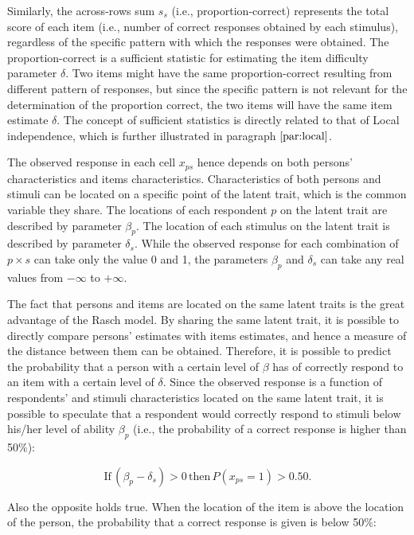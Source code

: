 \documentclass[12pt]{book}
\begin{document}
Similarly, the across-rows sum $s_s$ (i.e., proportion-correct) represents the total score of each item (i.e., number of correct responses obtained by each stimulus), regardless of the specific pattern with which the responses were obtained.  The proportion-correct is a sufficient statistic for estimating the item difficulty parameter $\delta$.
Two items might have the same proportion-correct resulting from different pattern of responses, but since the specific pattern is not relevant for the determination of the proportion correct, the two items will have the same item estimate $\delta$.
The concept of sufficient statistics is directly related to that of Local independence, which is further illustrated in paragraph $\ref{par:local}$.

The observed response in each cell $x_{ps}$ hence depends on both persons’ characteristics and items characteristics. 
Characteristics of both persons and stimuli can be located on a specific point of the latent trait, which is the common variable they share. 
The locations
 of each respondent $p$ on the latent trait are described by parameter $\beta_p$. The location of each stimulus on the latent trait is described by parameter $\delta_s$. 
While the observed response for each combination of $p \times s$ can take only the value 0 and 1, the parameters $\beta_p$ and $\delta_s$ can take any real values from $- \infty$ to $+ \infty$. 
 
The fact that persons and items are located on the same latent traits is the great advantage of the Rasch model. By sharing the same latent trait, it is possible to directly compare persons' estimates with items estimates, and hence a measure of the distance between them can be obtained. Therefore, it is possible to predict the probability that a person with a certain level of $\beta$ has of correctly respond to an item with a certain level of $\delta$. 
Since the observed response is a function of respondents' and stimuli characteristics located on the same latent trait, it is possible to speculate that a respondent would correctly respond to stimuli below his/her level of ability $\beta_p$ (i.e., the probability of a correct response is higher than 50\%): 

\begin{equation}\label{eq:rasch1}
	\text{If} \, (\beta_p - \delta_s) > 0 \, \text{then} \, P(x_{ps} = 1) > 0.50.
\end{equation}

Also the opposite holds true. When the location of the item is above the location of the person, the probability that a correct response is given is below 50\%: 
\end{document}
